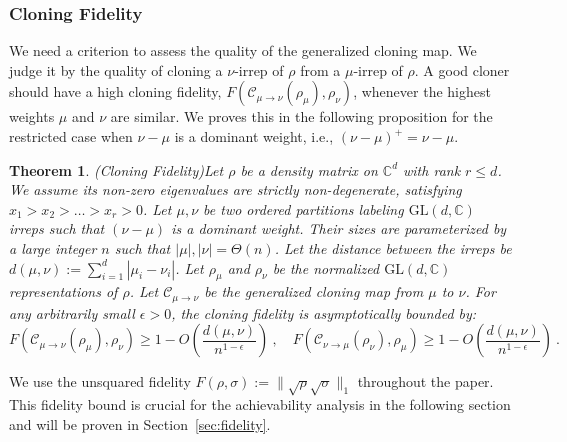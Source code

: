 \documentclass[a4paper,onecolumn,11pt]{quantumarticle}
\newtheorem{thm}{Theorem}
\def\C{\mathcal{C}}
\begin{document}
\subsubsection{Cloning Fidelity}
We need a criterion to assess the quality of the generalized cloning map. We judge it by the quality of cloning a $\nu$-irrep of $\rho$ from a $\mu$-irrep of $\rho$. A good cloner should have a high cloning fidelity, $F(\C_{\mu\to\nu}(\rho_\mu), \rho_\nu)$, whenever the highest weights $\mu$ and $\nu$ are similar. We proves this in the following proposition for the restricted case when $\nu-\mu$ is a dominant weight, i.e., $(\nu-\mu)^+=\nu-\mu$.
\begin{thm}(Cloning Fidelity)\label{thm:main}
    Let $\rho$ be a density matrix on $\mathbb{C}^d$ with rank $r \le d$. We assume its non-zero eigenvalues are strictly non-degenerate, satisfying $x_1 > x_2 > \dots > x_r > 0$. Let $\mu, \nu$ be two ordered partitions labeling $\mathrm{GL}(d,\mathbb C)$ irreps such that $(\nu-\mu)$ is a dominant weight. Their sizes are parameterized by a large integer $n$ such that $|\mu|,|\nu|=\Theta(n)$. Let the distance between the irreps be $d(\mu,\nu) := \sum_{i=1}^d |\mu_i-\nu_i|$. Let $\rho_{\mu}$ and $\rho_\nu$ be the normalized $\mathrm{GL}(d,\mathbb C)$ representations of $\rho$. Let $\C_{\mu\to\nu}$ be the generalized cloning map from $\mu$ to $\nu$. For any arbitrarily small $\epsilon>0$, the cloning fidelity is asymptotically bounded by:
    \begin{equation}
        F(\C_{\mu\to\nu}(\rho_\mu), \rho_\nu)\ge 1-O\left(\frac{d(\mu,\nu)}{n^{1-\epsilon}}\right)\ ,\quad F(\C_{\nu\to\mu}(\rho_\nu), \rho_\mu)\ge 1-O\left(\frac{d(\mu,\nu)}{n^{1-\epsilon}}\right) \ .
    \end{equation}
\end{thm}
We use the unsquared fidelity $F(\rho,\sigma):= \|\sqrt{\rho}\sqrt{\sigma}\|_1$ throughout the paper. This fidelity bound is crucial for the achievability analysis in the following section and will be proven in Section~\ref{sec:fidelity}. 
\end{document}
